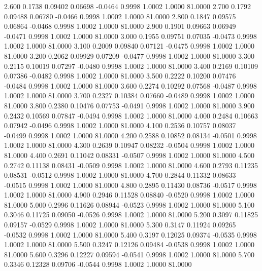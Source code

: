    2.600   0.1738   0.09402   0.06698  -0.0464   0.9998   1.0002   1.0000  81.0000
   2.700   0.1792   0.09488   0.06780  -0.0466   0.9998   1.0002   1.0000  81.0000
   2.800   0.1847   0.09575   0.06864  -0.0468   0.9998   1.0002   1.0000  81.0000
   2.900   0.1901   0.09663   0.06949  -0.0471   0.9998   1.0002   1.0000  81.0000
   3.000   0.1955   0.09751   0.07035  -0.0473   0.9998   1.0002   1.0000  81.0000
   3.100   0.2009   0.09840   0.07121  -0.0475   0.9998   1.0002   1.0000  81.0000
   3.200   0.2062   0.09929   0.07209  -0.0477   0.9998   1.0002   1.0000  81.0000
   3.300   0.2115   0.10019   0.07297  -0.0480   0.9998   1.0002   1.0000  81.0000
   3.400   0.2169   0.10109   0.07386  -0.0482   0.9998   1.0002   1.0000  81.0000
   3.500   0.2222   0.10200   0.07476  -0.0484   0.9998   1.0002   1.0000  81.0000
   3.600   0.2274   0.10292   0.07568  -0.0487   0.9998   1.0002   1.0000  81.0000
   3.700   0.2327   0.10384   0.07660  -0.0489   0.9998   1.0002   1.0000  81.0000
   3.800   0.2380   0.10476   0.07753  -0.0491   0.9998   1.0002   1.0000  81.0000
   3.900   0.2432   0.10569   0.07847  -0.0494   0.9998   1.0002   1.0000  81.0000
   4.000   0.2484   0.10663   0.07942  -0.0496   0.9998   1.0002   1.0000  81.0000
   4.100   0.2536   0.10757   0.08037  -0.0499   0.9998   1.0002   1.0000  81.0000
   4.200   0.2588   0.10852   0.08134  -0.0501   0.9998   1.0002   1.0000  81.0000
   4.300   0.2639   0.10947   0.08232  -0.0504   0.9998   1.0002   1.0000  81.0000
   4.400   0.2691   0.11042   0.08331  -0.0507   0.9998   1.0002   1.0000  81.0000
   4.500   0.2742   0.11138   0.08431  -0.0509   0.9998   1.0002   1.0000  81.0000
   4.600   0.2793   0.11235   0.08531  -0.0512   0.9998   1.0002   1.0000  81.0000
   4.700   0.2844   0.11332   0.08633  -0.0515   0.9998   1.0002   1.0000  81.0000
   4.800   0.2895   0.11430   0.08736  -0.0517   0.9998   1.0002   1.0000  81.0000
   4.900   0.2946   0.11528   0.08840  -0.0520   0.9998   1.0002   1.0000  81.0000
   5.000   0.2996   0.11626   0.08944  -0.0523   0.9998   1.0002   1.0000  81.0000
   5.100   0.3046   0.11725   0.09050  -0.0526   0.9998   1.0002   1.0000  81.0000
   5.200   0.3097   0.11825   0.09157  -0.0529   0.9998   1.0002   1.0000  81.0000
   5.300   0.3147   0.11924   0.09265  -0.0532   0.9998   1.0002   1.0000  81.0000
   5.400   0.3197   0.12025   0.09374  -0.0535   0.9998   1.0002   1.0000  81.0000
   5.500   0.3247   0.12126   0.09484  -0.0538   0.9998   1.0002   1.0000  81.0000
   5.600   0.3296   0.12227   0.09594  -0.0541   0.9998   1.0002   1.0000  81.0000
   5.700   0.3346   0.12328   0.09706  -0.0544   0.9998   1.0002   1.0000  81.0000
